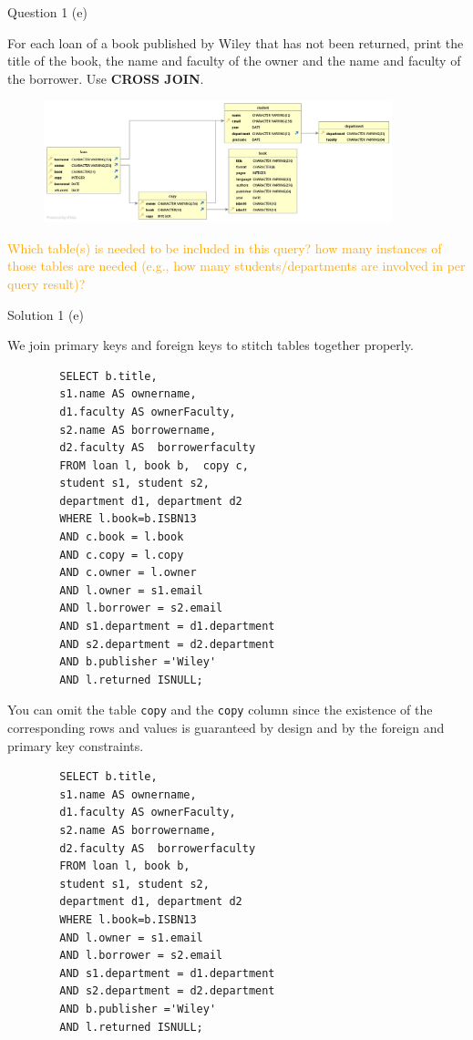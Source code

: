 \begin{frame}[fragile]{Question 1 (e)}

For each loan of a book published by Wiley that has not been returned, print the title of the book, the name and faculty of the owner and the name and faculty of the borrower. Use \textbf{CROSS JOIN}.

\begin{figure}
	\includegraphics[width=0.9\textwidth]{t1/images/t1-end.png}
\end{figure}

\textcolor{orange}{Which table(s) is needed to be included in this query? how many instances of those tables are needed (e.g., how many students/departments are involved in per query result)?}
\end{frame}


\begin{frame}[fragile]{Solution 1 (e)}

We join primary keys and foreign keys to stitch tables together properly. 
	
	\begin{lstlisting}
		SELECT b.title, 
		s1.name AS ownername, 
		d1.faculty AS ownerFaculty, 
		s2.name AS borrowername, 
		d2.faculty AS  borrowerfaculty
		FROM loan l, book b,  copy c, 
		student s1, student s2, 
		department d1, department d2
		WHERE l.book=b.ISBN13
		AND c.book = l.book 
		AND c.copy = l.copy 
		AND c.owner = l.owner
		AND l.owner = s1.email
		AND l.borrower = s2.email
		AND s1.department = d1.department
		AND s2.department = d2.department
		AND b.publisher ='Wiley'
		AND l.returned ISNULL;
	\end{lstlisting}
	
	You can omit the table \texttt{copy}  and the \texttt{copy} column since the existence of the corresponding rows and values is guaranteed by design and by the foreign and primary key constraints.
	
	\begin{lstlisting}
		SELECT b.title, 
		s1.name AS ownername, 
		d1.faculty AS ownerFaculty, 
		s2.name AS borrowername, 
		d2.faculty AS  borrowerfaculty
		FROM loan l, book b,  
		student s1, student s2, 
		department d1, department d2
		WHERE l.book=b.ISBN13
		AND l.owner = s1.email
		AND l.borrower = s2.email
		AND s1.department = d1.department
		AND s2.department = d2.department
		AND b.publisher ='Wiley'
		AND l.returned ISNULL;
	\end{lstlisting}

\end{frame}

